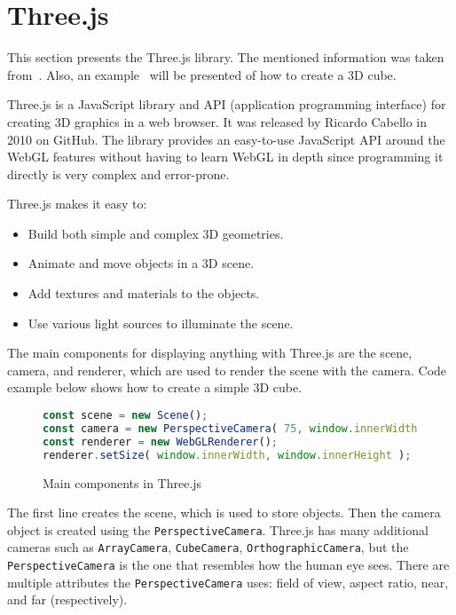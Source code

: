 \section{Three.js}\label{sec:three.js}
This section presents the Three.js library. The mentioned information was taken from~\citep{dirksen2013learning}. Also, an
example~\citep{threejsdocs} will be presented of how to create a 3D cube.

Three.js is a JavaScript library and API (application programming interface) for creating 3D graphics in a web browser. It was released by
Ricardo Cabello in 2010 on GitHub. The library provides an easy-to-use JavaScript API around the WebGL features without having to learn WebGL
in depth since programming it directly is very complex and error-prone.

\clearpage

Three.js makes it easy to:
\begin{itemize}
    \item Build both simple and complex 3D geometries.
    \item Animate and move objects in a 3D scene.
    \item Add textures and materials to the objects.
    \item Use various light sources to illuminate the scene.
\end{itemize}

The main components for displaying anything with Three.js are the scene, camera, and renderer, which are used to render the scene with the
camera. Code example below shows how to create a simple 3D cube.

\begin{figure}[hbt!]
    \begin{center}
        \begin{lstlisting}[language=JavaScript,label={lst:threejs-code-1},belowskip=-1 \baselineskip]
const scene = new Scene();
const camera = new PerspectiveCamera( 75, window.innerWidth / window.innerHeight, 0.1, 1000 );
const renderer = new WebGLRenderer();
renderer.setSize( window.innerWidth, window.innerHeight );
        \end{lstlisting}
    \end{center}
    \caption{Main components in Three.js}
    \label{fig:figure4.3}
\end{figure}

The first line creates the scene, which is used to store objects. Then the camera object is created using the \texttt{PerspectiveCamera}.
Three.js has many additional cameras such as \texttt{ArrayCamera}, \texttt{CubeCamera}, \texttt{OrthographicCamera}, but the
\texttt{PerspectiveCamera} is the one that resembles how the human eye sees. There are multiple attributes the \texttt{PerspectiveCamera}
uses: field of view, aspect ratio, near, and far (respectively).

